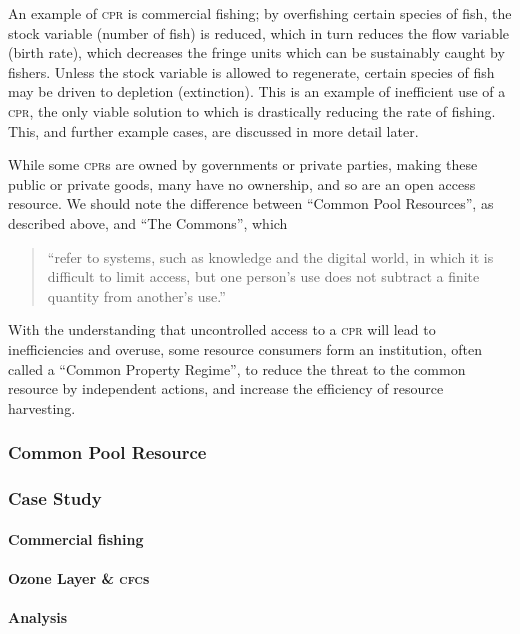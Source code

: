 \documentclass[]{article} %
\begin{document}
An example of \textsc{cpr} is commercial fishing; by overfishing certain species of fish, the stock variable (number of fish) is reduced, which in turn reduces the flow variable (birth rate), which decreases the fringe units which can be sustainably caught by fishers. Unless the stock variable is allowed to regenerate, certain species of fish may be driven to depletion (extinction). This is an example of inefficient use of a \textsc{cpr}, the only viable solution to which is drastically reducing the rate of fishing. This, and further example cases, are discussed in more detail later.

While some \textsc{cpr}s are owned by governments or private parties, making these public or private goods, many have no ownership, and so are an open access resource. We should note the difference between “Common Pool Resources”, as described above, and “The Commons”, which

\begin{quote}
	“refer to systems, such as knowledge and the digital world, in which it is difficult to limit access, but one person’s use does not subtract a finite quantity from another’s use.”~\cite{Ostrom-challenge-90}
\end{quote}

With the understanding that uncontrolled access to a \textsc{cpr} will lead to inefficiencies and overuse, some resource consumers form an institution, often called a “Common Property Regime”, to reduce the threat to the common resource by independent actions, and increase the efficiency of resource harvesting.

\subsubsection{Common Pool Resource}

\subsubsection{Case Study}

\paragraph{Commercial fishing}

\paragraph{Ozone Layer \& \textsc{cfc}s}

\paragraph{Analysis}
\end{document}
